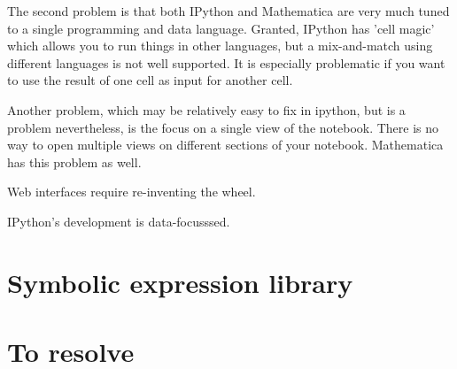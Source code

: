 \documentclass[11pt]{article}
\begin{document}
The second problem is that both IPython and Mathematica are very much
tuned to a single programming and data language. Granted, IPython has
'cell magic' which allows you to run things in other languages, but a
mix-and-match using different languages is not well supported. It is
especially problematic if you want to use the result of one cell as
input for another cell.

Another problem, which may be relatively easy to fix in ipython, but
is a problem nevertheless, is the focus on a single view of the
notebook. There is no way to open multiple views on different sections
of your notebook. Mathematica has this problem as well.

Web interfaces require re-inventing the wheel.

IPython's development is data-focusssed.

% 

\section{Symbolic expression library}





% 
% 
% 
% 

\section{To resolve}
\end{document}
